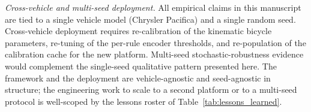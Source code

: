 \emph{Cross-vehicle and multi-seed deployment.} All empirical claims in this manuscript are tied to a single vehicle model (Chrysler Pacifica) and a single random seed. Cross-vehicle deployment requires re-calibration of the kinematic bicycle parameters, re-tuning of the per-rule encoder thresholds, and re-population of the calibration cache for the new platform. Multi-seed stochastic-robustness evidence would complement the single-seed qualitative pattern presented here. The framework and the deployment are vehicle-agnostic and seed-agnostic in structure; the engineering work to scale to a second platform or to a multi-seed protocol is well-scoped by the lessons roster of Table~\ref{tab:lessons_learned}.
